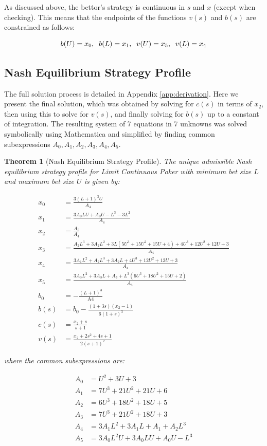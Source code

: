 \documentclass[a4paper,12pt]{article}
\theoremstyle{plain}
\newtheorem{theorem}{Theorem}[section]
\theoremstyle{definition}
\begin{document}
As discussed above, the bettor's strategy is continuous in $s$ and $x$ (except when checking). This means that the endpoints of the functions $v(s)$ and $b(s)$ are constrained as follows:

\begin{equation}{\label{continuityconstraints}}
	 b(U) = x_0, \;\; b(L) = x_1, \;\; v(U) = x_5, \;\; v(L) = x_4
\end{equation}

\subsection{Nash Equilibrium Strategy Profile}


The full solution process is detailed in Appendix \ref{app:derivation}. Here we present the final solution, which was obtained by solving for $c(s)$ in terms of $x_2$, then using this to solve for $v(s)$, and finally solving for $b(s)$ up to a constant of integration. The resulting system of 7 equations in 7 unknowns was solved symbolically using Mathematica and simplified by finding common subexpressions $A_0, A_1, A_2, A_3, A_4, A_5$. 

\begin{theorem}[Nash Equilibrium Strategy Profile]
    \label{thm:nash_equilibrium}
The unique admissible Nash equilibrium strategy profile for Limit Continuous Poker with minimum bet size $L$ and maximum bet size $U$ is given by:

\begin{align*}
    x_0 &= \frac{3 (L+1)^3 U}{A_4}\\
    x_1 &= \frac{3 A_0 L U+A_0 U-L^3-3 L^2}{A_4}\\
    x_2 &= \frac{A_5}{A_4}\\
    x_3 &= \frac{A_2 L^3+3 A_2 L^2+3 L \left(5 U^3+15 U^2+15 U+4\right)+4 U^3+12 U^2+12 U+3}{A_4}\\
    x_4 &= \frac{3 A_1 L^2+A_2 L^3+3 A_2 L+4 U^3+12 U^2+12 U+3}{A_4}\\
    x_5 &= \frac{3 A_3 L^2+3 A_3 L+A_3+L^3 \left(6 U^3+18 U^2+15 U+2\right)}{A_4}\\
    b_0 &= -\frac{(L+1)^3}{\text{A4}} \\ 
    b(s) &= b_0 - \frac{(1+3s)(x_2-1)}{6(1+s)^3}\\
    c(s) &= \frac{x_2+s}{s+1}\\
    v(s) &= \frac{x_2+2 s^2+4 s+1}{2 (s+1)^2}
\end{align*}

where the common subexpressions are:

\begin{align*}
	A_0 &= U^2+3 U+3 \\
    A_1 &= 7 U^3+21 U^2+21 U+6 \\
    A_2 &= 6 U^3+18 U^2+18 U+5 \\
    A_3 &= 7 U^3+21 U^2+18 U+3 \\
    A_4 &= 3 A_1 L^2+3 A_1 L+A_1+A_2 L^3 \\
    A_5 &= 3 A_0 L^2 U+3 A_0 L U+A_0 U-L^3
\end{align*}
\end{theorem}
\end{document}
